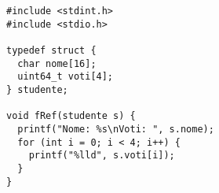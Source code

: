 
\begin{verbatim}
#include <stdint.h>
#include <stdio.h>

typedef struct {
  char nome[16];
  uint64_t voti[4];
} studente;

void fRef(studente s) {
  printf("Nome: %s\nVoti: ", s.nome);
  for (int i = 0; i < 4; i++) {
    printf("%lld", s.voti[i]);
  }
}

\end{verbatim}